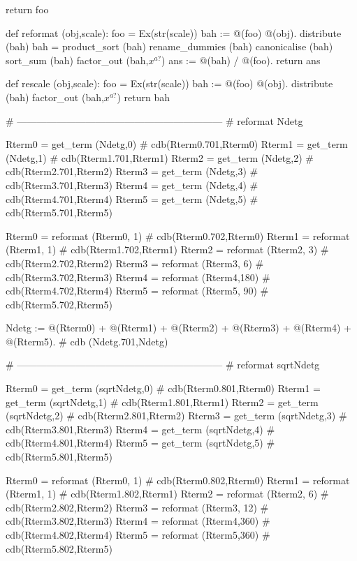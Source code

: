 \documentclass[12pt]{cdblatex}
\begin{document}
\begin{cadabra}
       return foo

   def reformat (obj,scale):
       foo  = Ex(str(scale))
       bah := @(foo) @(obj).
       distribute     (bah)
       bah = product_sort (bah)
       rename_dummies (bah)
       canonicalise   (bah)
       sort_sum       (bah)
       factor_out     (bah,$x^{a?}$)
       ans := @(bah) / @(foo).
       return ans

   def rescale (obj,scale):
       foo  = Ex(str(scale))
       bah := @(foo) @(obj).
       distribute  (bah)
       factor_out  (bah,$x^{a?}$)
       return bah

   # ---------------------------------------------------------------
   # reformat Ndetg

   Rterm0 = get_term (Ndetg,0)       # cdb(Rterm0.701,Rterm0)
   Rterm1 = get_term (Ndetg,1)       # cdb(Rterm1.701,Rterm1)
   Rterm2 = get_term (Ndetg,2)       # cdb(Rterm2.701,Rterm2)
   Rterm3 = get_term (Ndetg,3)       # cdb(Rterm3.701,Rterm3)
   Rterm4 = get_term (Ndetg,4)       # cdb(Rterm4.701,Rterm4)
   Rterm5 = get_term (Ndetg,5)       # cdb(Rterm5.701,Rterm5)

   Rterm0 = reformat (Rterm0,  1)    # cdb(Rterm0.702,Rterm0)
   Rterm1 = reformat (Rterm1,  1)    # cdb(Rterm1.702,Rterm1)
   Rterm2 = reformat (Rterm2,  3)    # cdb(Rterm2.702,Rterm2)
   Rterm3 = reformat (Rterm3,  6)    # cdb(Rterm3.702,Rterm3)
   Rterm4 = reformat (Rterm4,180)    # cdb(Rterm4.702,Rterm4)
   Rterm5 = reformat (Rterm5, 90)    # cdb(Rterm5.702,Rterm5)

   Ndetg := @(Rterm0) + @(Rterm1) + @(Rterm2) + @(Rterm3) + @(Rterm4) + @(Rterm5).  # cdb (Ndetg.701,Ndetg)

   # ---------------------------------------------------------------
   # reformat sqrtNdetg

   Rterm0 = get_term (sqrtNdetg,0)   # cdb(Rterm0.801,Rterm0)
   Rterm1 = get_term (sqrtNdetg,1)   # cdb(Rterm1.801,Rterm1)
   Rterm2 = get_term (sqrtNdetg,2)   # cdb(Rterm2.801,Rterm2)
   Rterm3 = get_term (sqrtNdetg,3)   # cdb(Rterm3.801,Rterm3)
   Rterm4 = get_term (sqrtNdetg,4)   # cdb(Rterm4.801,Rterm4)
   Rterm5 = get_term (sqrtNdetg,5)   # cdb(Rterm5.801,Rterm5)

   Rterm0 = reformat (Rterm0,  1)    # cdb(Rterm0.802,Rterm0)
   Rterm1 = reformat (Rterm1,  1)    # cdb(Rterm1.802,Rterm1)
   Rterm2 = reformat (Rterm2,  6)    # cdb(Rterm2.802,Rterm2)
   Rterm3 = reformat (Rterm3, 12)    # cdb(Rterm3.802,Rterm3)
   Rterm4 = reformat (Rterm4,360)    # cdb(Rterm4.802,Rterm4)
   Rterm5 = reformat (Rterm5,360)    # cdb(Rterm5.802,Rterm5)


\end{cadabra}
\end{document}
